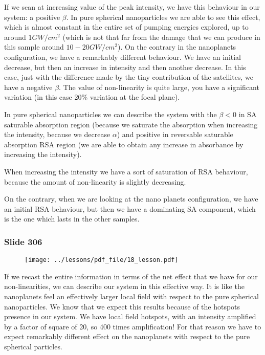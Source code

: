 \documentclass[../main/main.tex]{subfiles}
\begin{document}
If we scan at increasing value of the peak intensity, we have this behaviour in our system: a positive $\beta$.
In pure spherical nanoparticles we are able to see this effect, which is almost constant in the entire set of pumping energies explored, up to around $1GW/cm^2$ (which is not that far from the damage that we can produce in this sample around $10-20GW/cm^2$).
On the contrary in the nanoplanets configuration, we have a remarkably different behaviour.
We have an initial decrease, but then an increase in intensity and then another decrease.
In this case, just with the difference made by the tiny contribution of the satellites, we have a negative $\beta$.
The value of non-linearity is quite large, you have a significant variation (in this case 20\% variation at the focal plane).

In pure spherical nanoparticles we can describe the system with the $\beta<0$ in SA saturable absorption region (because we saturate the absorption when increasing the intensity, because we decrease $\alpha$) and positive in reversable saturable absorption RSA region (we are able to obtain any increase in absorbance by increasing the intensity). 

When increasing the intensity we have a sort of saturation of RSA behaviour, because the amount of non-linearity is slightly decreasing. 

On the contrary, when we are looking at the nano planets configuration, we have an initial RSA behaviour, but then we have a dominating SA component, which is the one which lasts in the other samples.

\newpage

\subsubsection{Slide 306}

\begin{figure}[h!]
\centering
\texttt{[image: ../lessons/pdf\_file/18\_lesson.pdf]}
\end{figure}

If we recast the entire information in terms of the net effect that we have for our non-linearities, we can describe our system in this effective way.
It is like the nanoplanets feel an effectively larger local field with respect to the pure spherical nanoparticles.
We know that we expect this results because of the hotspots presence in our system.
We have local field hotspots, with an intensity amplified by a factor of square of 20, so 400 times amplification!
For that reason we have to expect remarkably different effect on the nanoplanets with respect to the pure spherical particles.
\end{document}
